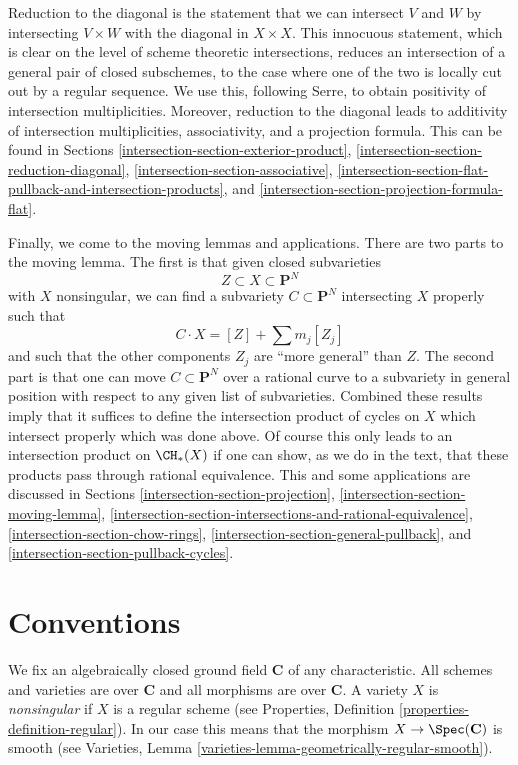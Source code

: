 \medskip\noindent
Reduction to the diagonal is the statement that we can intersect
$V$ and $W$ by intersecting $V \times W$ with the diagonal in $X \times X$.
This innocuous statement, which is clear on the level of scheme
theoretic intersections, reduces an intersection of a general pair
of closed subschemes, to the case where one of the two is locally cut
out by a regular sequence. We use this, following Serre, to obtain positivity
of intersection multiplicities. Moreover, reduction to the diagonal
leads to additivity of intersection multiplicities, associativity, and a
projection formula. This can be found in Sections
\ref{intersection-section-exterior-product},
\ref{intersection-section-reduction-diagonal},
\ref{intersection-section-associative},
\ref{intersection-section-flat-pullback-and-intersection-products}, and
\ref{intersection-section-projection-formula-flat}.

\medskip\noindent
Finally, we come to the moving lemmas and applications. There are two
parts to the moving lemma. The first is that given closed subvarieties
$$
Z \subset X \subset \mathbf{P}^N
$$
with $X$ nonsingular, we can find a subvariety $C \subset \mathbf{P}^N$
intersecting $X$ properly such that
$$
C \cdot X = [Z] + \sum m_j [Z_j]
$$
and such that the other components $Z_j$ are ``more general'' than $Z$.
The second part is that one can move $C \subset \mathbf{P}^N$ over
a rational curve to a subvariety in general position with respect to
any given list of subvarieties. Combined these results imply that it suffices
to define the intersection product of cycles on $X$ which intersect
properly which was done above. Of course this only leads to an intersection
product on $\CH_*(X)$ if one can show, as we do in the text, that these products
pass through rational equivalence. This and some applications are discussed
in Sections
\ref{intersection-section-projection},
\ref{intersection-section-moving-lemma},
\ref{intersection-section-intersections-and-rational-equivalence},
\ref{intersection-section-chow-rings},
\ref{intersection-section-general-pullback}, and
\ref{intersection-section-pullback-cycles}.

\section{Conventions}
\label{intersection-section-conventions}
We fix an algebraically closed ground field $\mathbf{C}$ of any
characteristic. All schemes and varieties are over $\mathbf{C}$ and all
morphisms are over $\mathbf{C}$. A variety $X$ is
{\it nonsingular} if $X$ is a regular scheme (see
Properties, Definition \ref{properties-definition-regular}).
In our case this means that the morphism $X \to \Spec(\mathbf{C})$
is smooth (see
Varieties, Lemma \ref{varieties-lemma-geometrically-regular-smooth}).


